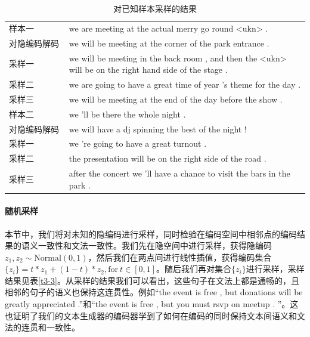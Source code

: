 \begin{table}[htb]
    \center
    \caption{\label{t3-2}对已知样本采样的结果}
    \begin{tabular*}{\linewidth}{p{0.2\linewidth}p{0.8\linewidth}}
\toprule
样本一 & we are meeting at the actual merry go round <ukn> . \\
对隐编码解码 & we will be meeting at the corner of the park entrance .\\ 
采样一 & we will be meeting in the back room , and then the <ukn> will be on the right hand side of the stage .\\
采样二 & we are going to have a great time of year 's theme for the day . \\
采样三 & we will be meeting at the end of the day before the show . \\
\midrule
样本二 & we 'll be there the whole night . \\
对隐编码解码 & we will have a dj spinning the best of the night !\\ 
采样一 & we 're going to have a great turnout .\\
采样二 & the presentation will be on the right side of the road .\\
采样三 & after the concert we 'll have a chance to visit the bars in the park . \\
\bottomrule
    \end{tabular*}
\end{table}
\paragraph{随机采样}
本节中，我们将对未知的隐编码进行采样，同时检验在编码空间中相邻点的编码结果的语义一致性和文法一致性。我们先在隐空间中进行采样，获得隐编码$z_1,z_2 \sim \mathrm{Normal}(0,1)$，然后我们在两点间进行线性插值，获得编码集合$\{z_i\} = t*z_1+(1-t)*z_2 ,\mathrm{for}\ t \in [0,1]$。随后我们再对集合$\{z_i\}$进行采样，采样结果见表\ref{t3-3}。从采样的结果我们可以看出，这些句子在文法上都是通畅的，且相邻的句子的语义也保持这连贯性。例如“the event is free , but donations will be greatly appreciated .”和“the event is free , but you must rsvp on meetup . ”。这也证明了我们的文本生成器的编码器学到了如何在编码的同时保持文本间语义和文法的连贯和一致性。

